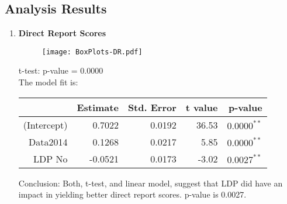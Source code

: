 \documentclass[11pt]{extarticle} %
\begin{document}
\subsection*{Analysis Results}
\begin{enumerate}
\item {\bf{Direct Report Scores}}\\
\begin{minipage}[t]{0.3\textwidth}
\begin{figure}[H]
\centering 
\texttt{[image: BoxPlots-DR.pdf]}
\end{figure}
\end{minipage}
\begin{minipage}[t]{0.6\textwidth}
\vspace{0.8cm}
t-test: p-value = 0.0000 \\
The model fit is:
\begin{table}[H]
\centering
\begin{tabular}{rrrrr}
  \hline
 & Estimate & Std. Error & t value & p-value \\ 
  \hline
  (Intercept) & 0.7022 & 0.0192 & 36.53 & $0.0000^{**}$ \\ 
  Data2014 & 0.1268 & 0.0217 & 5.85 & $0.0000^{**}$ \\ 
  LDP No & -0.0521 & 0.0173 & -3.02 & $0.0027^{**}$ \\ 
   \hline
\end{tabular}
\end{table}
Conclusion: Both, t-test, and linear model, suggest that LDP did have an impact in yielding better direct report scores. p-value is 0.0027. 
\end{minipage}


\end{enumerate}
\end{document}

